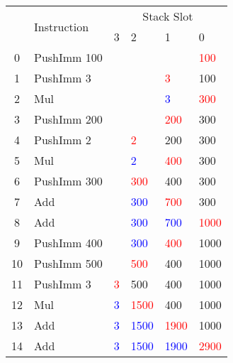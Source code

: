 \documentclass{report}
\newcommand{\hot}[1]{\textcolor{red}{#1}}
\newcommand{\old}[1]{\textcolor{blue}{#1}}
\begin{document}
\begin{center}
	\begin{tabular}{c l | l l l l}
		   & \multirow{2}{*}{Instruction} & \multicolumn{4}{c}{Stack Slot}                                        \\
		   &                              & 3                              & 2          & 1          & 0          \\
		\hline
		0  & PushImm 100                  &                                &            &            & \hot{100}  \\
		1  & PushImm 3                    &                                &            & \hot{3}    & 100        \\
		2  & Mul                          &                                &            & \old{3}    & \hot{300}  \\
		3  & PushImm 200                  &                                &            & \hot{200}  & 300        \\
		4  & PushImm 2                    &                                & \hot{2}    & 200        & 300        \\
		5  & Mul                          &                                & \old{2}    & \hot{400}  & 300        \\
		6  & PushImm 300                  &                                & \hot{300}  & 400        & 300        \\
		7  & Add                          &                                & \old{300}  & \hot{700}  & 300        \\
		8  & Add                          &                                & \old{300}  & \old{700}  & \hot{1000} \\
		9  & PushImm 400                  &                                & \old{300}  & \hot{400}  & 1000       \\
		10 & PushImm 500                  &                                & \hot{500}  & 400        & 1000       \\
		11 & PushImm 3                    & \hot{3}                        & 500        & 400        & 1000       \\
		12 & Mul                          & \old{3}                        & \hot{1500} & 400        & 1000       \\
		13 & Add                          & \old{3}                        & \old{1500} & \hot{1900} & 1000       \\
		14 & Add                          & \old{3}                        & \old{1500} & \old{1900} & \hot{2900} \\
	\end{tabular}
\end{center}
\end{document}
